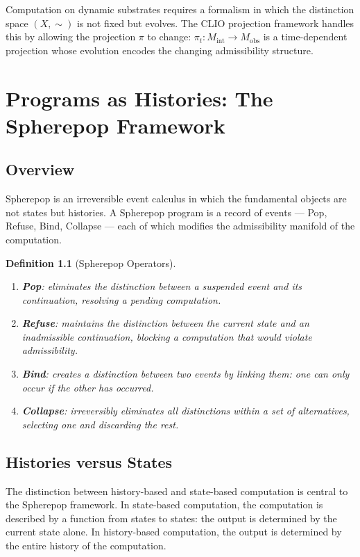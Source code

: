 \documentclass[12pt,a4paper]{book}
\newtheorem{definition}[theorem]{Definition}
\theoremstyle{remark}
\theoremstyle{definition}
\begin{document}
Computation on dynamic substrates requires a formalism in which the
distinction space $(X, \sim)$ is not fixed but evolves. The CLIO
projection framework handles this by allowing the projection $\pi$ to
change: $\pi_t : M_{\mathrm{int}} \to M_{\mathrm{obs}}$ is a
time-dependent projection whose evolution encodes the changing
admissibility structure.

\chapter{Programs as Histories: The Spherepop Framework}

\section{Overview}

Spherepop is an irreversible event calculus in which the fundamental
objects are not states but histories. A Spherepop program is a record
of events --- Pop, Refuse, Bind, Collapse --- each of which modifies
the admissibility manifold of the computation.

\begin{definition}[Spherepop Operators]
\begin{enumerate}[label=(\roman*)]
  \item \textbf{Pop}: eliminates the distinction between a suspended
        event and its continuation, resolving a pending computation.
  \item \textbf{Refuse}: maintains the distinction between the current
        state and an inadmissible continuation, blocking a computation
        that would violate admissibility.
  \item \textbf{Bind}: creates a distinction between two events by
        linking them: one can only occur if the other has occurred.
  \item \textbf{Collapse}: irreversibly eliminates all distinctions
        within a set of alternatives, selecting one and discarding the
        rest.
\end{enumerate}
\end{definition}

\section{Histories versus States}

The distinction between history-based and state-based computation is
central to the Spherepop framework. In state-based computation, the
computation is described by a function from states to states: the output
is determined by the current state alone. In history-based computation,
the output is determined by the entire history of the computation.
\end{document}
